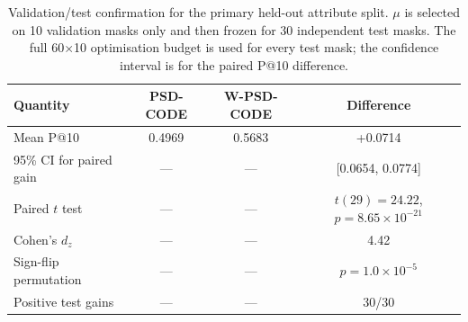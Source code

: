 \begin{table}
\centering
\caption{Validation/test confirmation for the primary held-out attribute split. $\mu$ is selected on 10 validation masks only and then frozen for 30 independent test masks. The full 60$\times$10 optimisation budget is used for every test mask; the confidence interval is for the paired P@10 difference.}
\label{tab:heldout_validation_test}
\begin{tabular}{lccc}
\toprule
Quantity & PSD-CODE & W-PSD-CODE & Difference \\
\midrule
Mean P@10 & 0.4969 & 0.5683 & +0.0714 \\
95\% CI for paired gain & --- & --- & [0.0654, 0.0774] \\
Paired $t$ test & --- & --- & $t(29)=24.22$, $p=8.65\times10^{-21}$ \\
Cohen's $d_z$ & --- & --- & 4.42 \\
Sign-flip permutation & --- & --- & $p=1.0\times10^{-5}$ \\
Positive test gains & --- & --- & 30/30 \\
\bottomrule
\end{tabular}
\end{table}
